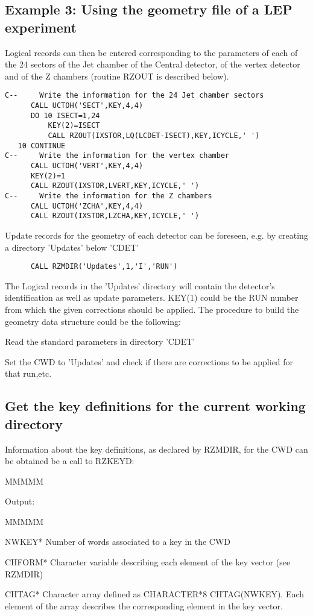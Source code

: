 \subsection{Example 3: Using the geometry file of a LEP experiment}
\par Logical records can then be entered corresponding to the parameters
of each of the 24 sectors of the Jet chamber of the Central detector,
of the vertex detector and of the Z chambers
(routine RZOUT is described below).
\begin{verbatim}
C--     Write the information for the 24 Jet chamber sectors
      CALL UCTOH('SECT',KEY,4,4)
      DO 10 ISECT=1,24
          KEY(2)=ISECT
          CALL RZOUT(IXSTOR,LQ(LCDET-ISECT),KEY,ICYCLE,' ')
   10 CONTINUE
C--     Write the information for the vertex chamber
      CALL UCTOH('VERT',KEY,4,4)
      KEY(2)=1
      CALL RZOUT(IXSTOR,LVERT,KEY,ICYCLE,' ')
C--     Write the information for the Z chambers
      CALL UCTOH('ZCHA',KEY,4,4)
      CALL RZOUT(IXSTOR,LZCHA,KEY,ICYCLE,' ')
\end{verbatim}
Update records for the geometry of each detector can be foreseen, e.g.
by creating a directory 'Updates' below 'CDET'
\begin{verbatim}
      CALL RZMDIR('Updates',1,'I','RUN')
\end{verbatim}
The Logical records in the 'Updates' directory will contain the
detector's identification as well as update parameters. KEY(1) could be
the RUN number from which the given corrections should be applied.
The procedure to build the geometry data structure could be the following:
\begin{UL}
\item Read the standard parameters in directory 'CDET'
\item Set the CWD to 'Updates' and check if there are corrections
to be applied for that run,etc.
\end{UL}
\subsection{Get the key definitions for the current working directory}
\par Information about the key definitions, as declared by RZMDIR,
for the CWD can be obtained be a call to RZKEYD:
\begin{DL}{MMMMM}
\item[Output:
]
\begin{DL}{MMMMM}
\item[NWKEY*
]Number of words associated to a key in the CWD
\item[CHFORM*
]Character variable describing each element of the key vector
(see RZMDIR)
\item[CHTAG*
]Character array defined as CHARACTER*8 CHTAG(NWKEY).
\newline Each element of the array describes the corresponding
element in the key vector.
\end{DL}
\end{DL}

